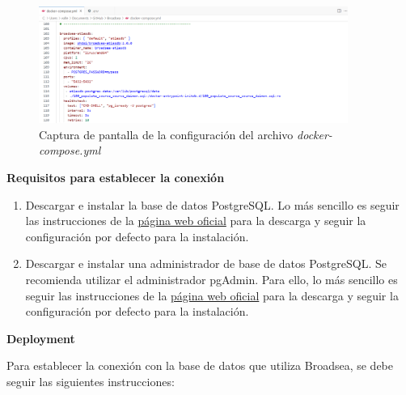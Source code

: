 \documentclass{article}
\begin{document}
\begin{figure}[H]
    \centering
    \includegraphics[width=0.90\textwidth]{images/dockerComposeDB.png}
     \caption{Captura de pantalla de la configuración del archivo \textit{docker-compose.yml}}
    \label{fig:dockerComposeDB}
\end{figure}

\textbf{Requisitos para establecer la conexión}

\begin{enumerate}

    \item Descargar e instalar la base de datos PostgreSQL. Lo más sencillo es seguir las instrucciones de la \href{https://www.postgresql.org/download/}{página web oficial} para la descarga y seguir la configuración por defecto para la instalación.

    \item Descargar e instalar una administrador de base de datos PostgreSQL. Se recomienda utilizar el administrador pgAdmin. Para ello, lo más sencillo es seguir las instrucciones de la \href{https://www.pgadmin.org/download/}{página web oficial} para la descarga y seguir la configuración por defecto para la instalación.
    
\end{enumerate}


\textbf{Deployment}

Para establecer la conexión con la base de datos que utiliza Broadsea, se debe seguir las siguientes instrucciones:
\end{document}
